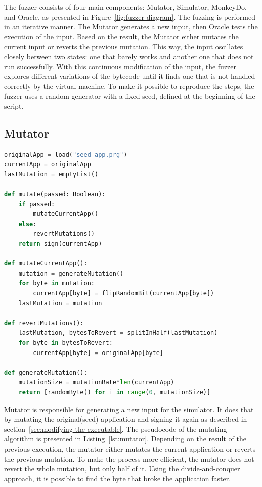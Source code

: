 The fuzzer consists of four main components: Mutator, Simulator, MonkeyDo, and Oracle, as presented in Figure~\ref{fig:fuzzer-diagram}.
The fuzzing is performed in an iterative manner.
The Mutator generates a new input, then Oracle tests the execution of the input.
Based on the result, the Mutator either mutates the current input or reverts the previous mutation.
This way, the input oscillates closely between two states: one that barely works and another one that does not run successfully.
With this continuous modification of the input, the fuzzer explores different variations of the bytecode until it finds one that is not handled correctly by the virtual machine.
To make it possible to reproduce the steps, the fuzzer uses a random generator with a fixed seed, defined at the beginning of the script.


\subsection*{Mutator}
\begin{lstlisting}[caption={Pseudocode of the mutating algorithm},captionpos=b,label={lst:mutator},language=Python]
originalApp = load("seed_app.prg")
currentApp = originalApp
lastMutation = emptyList()

def mutate(passed: Boolean):
    if passed:
        mutateCurrentApp()
    else:
        revertMutations()
    return sign(currentApp)

def mutateCurrentApp():
    mutation = generateMutation()
    for byte in mutation:
        currentApp[byte] = flipRandomBit(currentApp[byte])
    lastMutation = mutation

def revertMutations():
    lastMutation, bytesToRevert = splitInHalf(lastMutation)
    for byte in bytesToRevert:
        currentApp[byte] = originalApp[byte]

def generateMutation():
    mutationSize = mutationRate*len(currentApp)
    return [randomByte() for i in range(0, mutationSize)]
\end{lstlisting}

Mutator is responsible for generating a new input for the simulator.
It does that by mutating the original(seed) application and signing it again as described in section~\ref{sec:modifying-the-executable}.
The pseudocode of the mutating algorithm is presented in Listing~\ref{lst:mutator}.
Depending on the result of the previous execution, the mutator either mutates the current application or reverts the previous mutation.
To make the process more efficient, the mutator does not revert the whole mutation, but only half of it.
Using the divide-and-conquer approach, it is possible to find the byte that broke the application faster.


